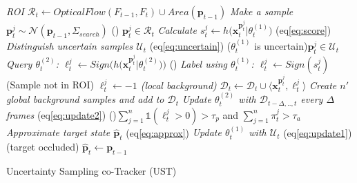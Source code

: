 \documentclass[conference,twoside]{IEEEtran}
\begin{document}
\begin{algorithm}[!t]
\DontPrintSemicolon
{}

\BlankLine

\emph{ROI $\mathcal{R}_t \leftarrow OpticalFlow (F_{t-1},F_t) \cup Area(\mathbf{p}_{t-1})$}\;
{
\emph{Make a sample $\mathbf{p}_t^j \sim \mathcal{N}(\mathbf{p}_{t-1},\Sigma_{search})$}\;
\uIf(){ $\mathbf{p}_t^j \in \mathcal{R}_t$}
	{
	\emph{Calculate $s_t^j \leftarrow h \big( \mathbf{x}_t^{\mathbf{p}_t^j} | \theta_t^{(1)} \big)$} (eq\eqref{eq:score})\;
	\emph{Distinguish uncertain samples $\mathcal{U}_t$} (eq\eqref{eq:uncertain})\;
	\uIf($\theta_t^{(1)}$ is uncertain){$\mathbf{p}_t^j \in \mathcal{U}_t$}
		{
		\emph{Query $\theta_t^{(2)}$: $\ell_t^j \leftarrow Sign \Big( h \big( \mathbf{x}_t^{\mathbf{p}_t^j} | \theta_t^{(2)} \big) \Big)$}\;		
		}
	\Else()
		{
		\emph{Label using $\theta_t^{(1)}$: $\ell_t^j \leftarrow Sign( s_t^j )$}\;
		}%
	}
\Else(Sample not in ROI)
	{
	\emph{$\ell^j_t \leftarrow -1$ (local background)}\;
	}%
\emph{$\mathcal{D}_t \leftarrow \mathcal{D}_t \cup \langle \mathbf{x}_t^{\mathbf{p}_t^j} , \ell^j_t  \rangle$}\;
}%
\emph{Create $n'$ global background samples and add to $\mathcal{D}_t$}\;
\emph{Update $\theta_t^{(2)}$ with $\mathcal{D}_{t-\Delta,..,t}$ every $\Delta$ frames} (eq\eqref{eq:update2})\;
\uIf(){$\sum_{j=1}^n \mathds{1}(\ell^j_t > 0) > \tau_p$ and $\sum_{j=1}^n \pi_t^j > \tau_a$}
		{
		\emph{Approximate target state $\mathbf{\hat{p}}_t$} (eq\eqref{eq:approx}) \;
		\emph{Update $\theta_t^{(1)}$ with $\mathcal{U}_t$} (eq\eqref{eq:update1})\;
		}
	\Else(target occluded)
		{
		\emph{$\mathbf{\hat{p}}_t \leftarrow \mathbf{p}_{t-1}$}\;		
		}%
\BlankLine

\caption{Uncertainty Sampling co-Tracker (UST)}
\label{alg:ust}
\end{algorithm}
\end{document}
